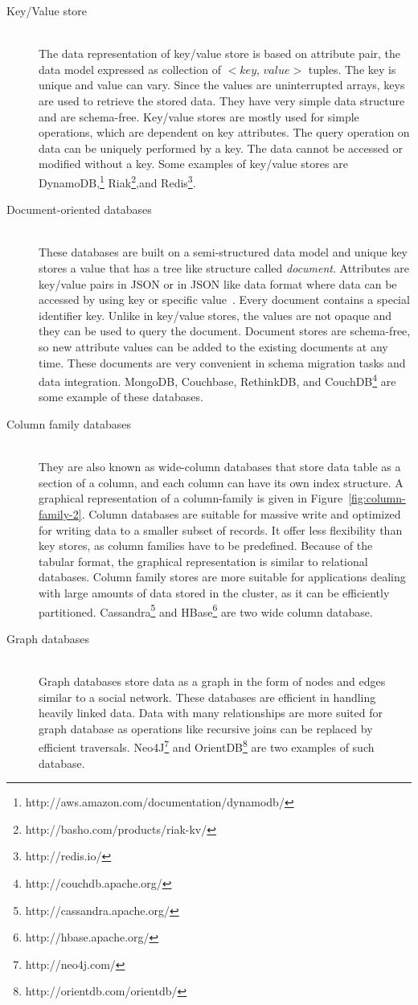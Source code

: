 \documentclass[a4paper,12pt]{book}
\begin{document}
	\begin{description}
		\item[Key/Value store] \hfill \\ 
		The data representation of key/value store is based on attribute pair, the data model expressed as collection of $<$$key$, $value$$>$ tuples. The key is unique and value can vary. Since the values are uninterrupted arrays, keys are used to retrieve the stored data. They have very simple data structure and are schema-free. Key/value stores are mostly used for simple operations, which are dependent on key attributes. The query operation on data can be uniquely performed by a key. The data cannot be accessed or modified without a key. Some examples of key/value stores are DynamoDB,\footnote{http://aws.amazon.com/documentation/dynamodb/} Riak\footnote{http://basho.com/products/riak-kv/},and Redis\footnote{http://redis.io/}.
		\item[Document-oriented databases] \hfill \\ 
	These databases	are built on a semi-structured data model and unique key stores a value that has a tree like structure called \textit{document}. Attributes are key/value pairs in JSON or in JSON like data format where data can be accessed by using key or specific value~\citep{hecht2011nosql}. Every document contains a special identifier key. Unlike in key/value stores, the values are not opaque and  they can be used to query the document. Document stores are schema-free, so new attribute values can be added to the existing documents at any time. These documents are very convenient in schema migration tasks and data integration.  MongoDB, Couchbase, RethinkDB, and CouchDB\footnote{http://couchdb.apache.org/} are some example of these databases.
		\item [Column family databases] \hfill \\
		They are also known as wide-column databases that store data table as a section of a column, and each column can have  its own index structure. A graphical representation of a column-family is given in  Figure~\ref{fig:column-family-2}. Column databases are suitable for massive write  and optimized for writing data to a smaller subset of records. It offer less flexibility than key stores, as column families have to be predefined. Because of the tabular format, the graphical representation is similar to relational databases. Column family stores are more suitable for applications dealing with large amounts of data stored in the cluster, as it can be efficiently partitioned.  Cassandra\footnote{http://cassandra.apache.org/} and HBase\footnote{http://hbase.apache.org/} are two wide column database.
		\item[Graph databases] \hfill \\
		Graph databases store data as a  graph in the form of nodes and edges similar to a social network. These databases are efficient in handling heavily linked data. Data with many relationships are more suited for graph database as  operations like recursive joins can be replaced by efficient traversals. Neo4J\footnote{http://neo4j.com/} and OrientDB\footnote{http://orientdb.com/orientdb/} are two examples of such database.


\end{description}
\end{document}
